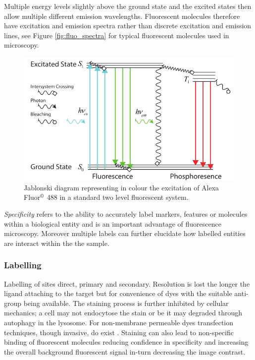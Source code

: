 
Multiple energy levels slightly above the ground state and the excited states then allow multiple different emission wavelengths.
Fluorescent molecules therefore have excitation and emission spectra rather than discrete excitation and emission lines, see Figure \ref{fig:fluo_spectra} for typical fluorescent molecules used in microscopy.

\begin{figure}
    \centering
    \includegraphics[width=0.7\linewidth]{jablonski_triplet}
    \caption[Standard jablonski diagram]{Jablonski diagram representing in colour the excitation of Alexa Fluor\(^{\copyright}\) 488 in a standard two level fluorescent system.}\label{fig:jablonski}
\end{figure}


\emph{Specificity} refers to the ability to accurately label markers, features or molecules within a biological entity and is an important advantage of fluorescence microscopy.
Moreover multiple labels can further elucidate how labelled entities are interact within the the sample.

\subsubsection{Labelling}


Labelling of sites direct, primary and secondary.
Resolution is lost the longer the ligand attaching to the target but for convenience of dyes with the suitable anti-group being available.
The staining process is further inhibited by cellular mechanics; a cell may not endocytose the stain or be it may degraded through autophagy in the lysosome.
For non-membrane permeable dyes transfection techniques, though invasive, do exist \cite{}.
Staining can also lead to non-specific binding of fluorescent molecules reducing confidence in specificity and increasing the overall background fluorescent signal in-turn decreasing the image contrast.

